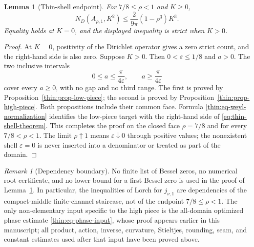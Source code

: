 \documentclass[11pt]{article}
\numberwithin{equation}{section}
\newtheorem{lemma}[theorem]{Lemma}
\theoremstyle{definition}
\theoremstyle{remark}
\newtheorem{remark}[theorem]{Remark}
\begin{document}
\begin{lemma}[Thin-shell endpoint]
\label{lem:thin-shell}
For \(7/8\leq\rho<1\) and \(K\geq0\),
\begin{equation}
  N_D(A_{\rho,1},K^2)
  \leq\frac{2}{9\pi}(1-\rho^3)K^3.
  \label{eq:thin-shell-theorem}
\end{equation}
Equality holds at \(K=0\), and the displayed inequality is strict when
\(K>0\).
\end{lemma}

\begin{proof}
At \(K=0\), positivity of the Dirichlet operator gives a zero strict count,
and the right-hand side is also zero.  Suppose \(K>0\).  Then
\(0<\varepsilon\leq1/8\) and \(a>0\).  The two inclusive intervals
\[
  0\leq a\leq\frac{\pi}{4\varepsilon},
  \qquad
  a\geq\frac{\pi}{4\varepsilon}
\]
cover every \(a\geq0\), with no gap and no third range.  The first is proved
by Proposition~\ref{thin:prop-low-piece}; the second is proved by
Proposition~\ref{thin:prop-high-piece}.  Both propositions include their
common face.  Formula \eqref{thin:eq-weyl-normalization} identifies the
low-piece target with the right-hand side of
\eqref{eq:thin-shell-theorem}.  This completes the proof on the closed face
\(\rho=7/8\) and for every \(7/8<\rho<1\).  The limit
\(\rho\uparrow1\) means \(\varepsilon\downarrow0\) through positive values;
the nonexistent shell \(\varepsilon=0\) is never inserted into a
denominator or treated as part of the domain.
\end{proof}

\begin{remark}[Dependency boundary]
\label{thin:rem-no-lorch}
No finite list of Bessel zeros, no numerical root certificate, and no lower
bound for a first Bessel zero is used in the proof of
Lemma~\ref{lem:thin-shell}.  In particular, the inequalities of Lorch for
\(j_{\nu,1}\) are dependencies of the compact-middle finite-channel
staircase, not of the endpoint \(7/8\leq\rho<1\).  The only non-elementary
input specific to the high piece is the all-domain optimized phase estimate
\eqref{thin:eq-phase-input}, whose proof appears earlier in this manuscript;
all product, action, inverse, curvature, Stieltjes, rounding, seam, and
constant estimates used after that input have been proved above.
\end{remark}

\end{document}
